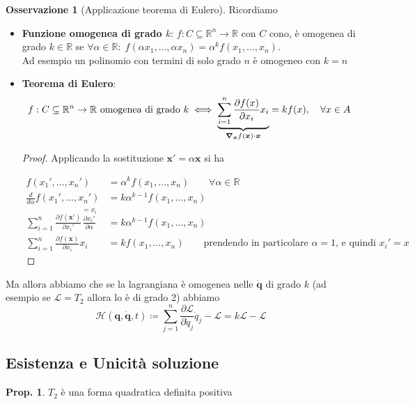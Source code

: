 \documentclass[a4paper,10pt]{article}
\theoremstyle{definition}
\newcommand{\bv}{\boldsymbol} %
\newcommand{\re}{\mathbb{R}} %
\theoremstyle{indentdefinition}
\theoremstyle{indenttheorem}
\newtheorem{prop}{Prop.}
\theoremstyle{myremark}
\newtheorem*{rem*}{Osservazione}
\theoremstyle{indentgeneral}
\begin{document}
\begin{rem*}[Applicazione teorema di Eulero] Ricordiamo
\begin{itemize}
    \item  \textbf{Funzione  omogenea di grado $k$}: $f:C\subseteq \re^n\to\re$ con $C$ cono, è omogenea di grado $k\in\re$ se $\forall\alpha\in\re\colon \; f(\alpha x_1,\dots,\alpha x_n)=\alpha^kf(x_1,\dots,x_n)$. \\
    Ad esempio un polinomio con termini di solo grado $n$ è omogeneo con $k=n$
    \item \textbf{Teorema di Eulero}: $$f:C\subseteq \re^n\to\re \text{ omogenea di grado } k\iff \underbrace{\sum _{i=1}^{n}{\frac {\partial f(x)}{\partial x_{i}}} x_{i}}_{\grad_{\bv{x}} f(\bv{x})\cdot\bv{x}}=k f(x),\quad \forall x\in A$$
    \begin{proof}
        Applicando la sostituzione $\bv{x}'=\alpha\bv{x}$ si ha

\begin{align*}
    f(x_1',\dots,x_n')&=\alpha^kf(x_1,\dots,x_n) \qquad\forall\alpha\in\re\\
    \frac{d}{d\alpha}f(x_1',\dots,x_n')&=k\alpha^{k-1}f(x_1,\dots,x_n) \\
     \sum _{i=1}^{n}{\frac {\partial f(\bv{x}')}{\partial x_{i}'}} \overset{=x_i}{\boxed{\frac{\partial x_{i}'}{\partial \alpha}}}&=k\alpha^{k-1}f(x_1,\dots,x_n) \\
    \sum _{i=1}^{n}{\frac {\partial f(\bv{x})}{\partial x_{i}}} x_{i}&=kf(x_1,\dots,x_n)
    \qquad\text{prendendo in particolare $\alpha=1$, e quindi $x_i'=x$}
\end{align*}
    \end{proof}
\end{itemize}
 Ma allora abbiamo che se la lagrangiana è omogenea nelle $\dot{\bv{q}}$ di grado $k$ (ad esempio se $\mathcal{L}=T_2$ allora lo è di grado 2) abbiamo 
    $$\mathcal{H}\left(\bv{q},\dot{\bv{q}},t\right)\coloneqq\sum_{j=1}^{n}\frac{\partial\mathcal{L}}{\partial\dot{q}_{j}}\dot{q}_{j}-\mathcal{L}=\boxed{k\mathcal{L}-\mathcal{L}}$$
   
\end{rem*}

\subsection{Esistenza e Unicità soluzione}


\begin{prop}
$T_{2}$ è una forma quadratica definita positiva
\end{prop}
\end{document}
